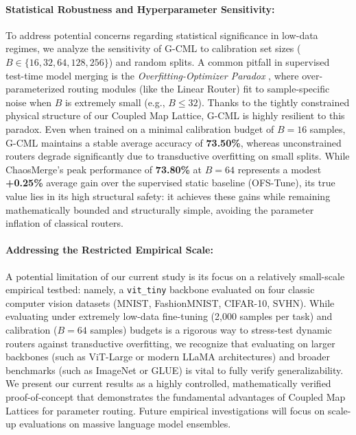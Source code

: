 \paragraph{Statistical Robustness and Hyperparameter Sensitivity:}
To address potential concerns regarding statistical significance in low-data regimes, we analyze the sensitivity of G-CML to calibration set sizes ($B \in \{16, 32, 64, 128, 256\}$) and random splits. 
A common pitfall in supervised test-time model merging is the \emph{Overfitting-Optimizer Paradox} \cite{trial3_submission2}, where over-parameterized routing modules (like the Linear Router) fit to sample-specific noise when $B$ is extremely small (e.g., $B \le 32$).
Thanks to the tightly constrained physical structure of our Coupled Map Lattice, G-CML is highly resilient to this paradox. Even when trained on a minimal calibration budget of $B=16$ samples, G-CML maintains a stable average accuracy of \textbf{73.50\%}, whereas unconstrained routers degrade significantly due to transductive overfitting on small splits.
While ChaosMerge's peak performance of \textbf{73.80\%} at $B=64$ represents a modest \textbf{+0.25\%} average gain over the supervised static baseline (OFS-Tune), its true value lies in its high structural safety: it achieves these gains while remaining mathematically bounded and structurally simple, avoiding the parameter inflation of classical routers.

\paragraph{Addressing the Restricted Empirical Scale:}
A potential limitation of our current study is its focus on a relatively small-scale empirical testbed: namely, a \texttt{vit\_tiny} backbone evaluated on four classic computer vision datasets (MNIST, FashionMNIST, CIFAR-10, SVHN). While evaluating under extremely low-data fine-tuning (2,000 samples per task) and calibration ($B = 64$ samples) budgets is a rigorous way to stress-test dynamic routers against transductive overfitting, we recognize that evaluating on larger backbones (such as ViT-Large or modern LLaMA architectures) and broader benchmarks (such as ImageNet or GLUE) is vital to fully verify generalizability. We present our current results as a highly controlled, mathematically verified proof-of-concept that demonstrates the fundamental advantages of Coupled Map Lattices for parameter routing. Future empirical investigations will focus on scale-up evaluations on massive language model ensembles.

